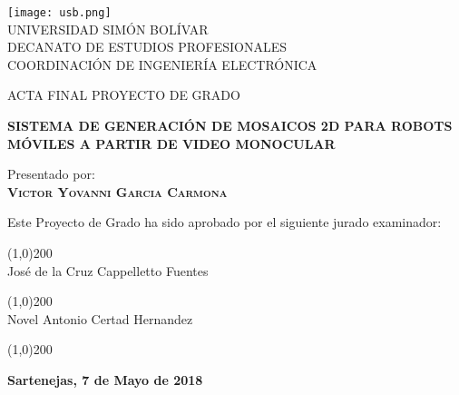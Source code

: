 \begin{titlepage}
\begin{center}

\texttt{[image: usb.png]} \\

\textsc {\large UNIVERSIDAD SIMÓN BOLÍVAR} \\
\textsc{DECANATO DE ESTUDIOS PROFESIONALES\\
COORDINACIÓN DE INGENIERÍA ELECTRÓNICA}

\bigskip
\bigskip
\bigskip
\bigskip

\textsc{ACTA FINAL PROYECTO DE GRADO}

\bigskip
\bigskip

\textsc{\bfseries SISTEMA DE GENERACIÓN DE MOSAICOS 2D PARA ROBOTS MÓVILES A PARTIR DE VIDEO MONOCULAR}

\bigskip
\bigskip
\bigskip

\begin{minipage}{\textwidth}
\centering
Presentado por: \\
\textsc{\bfseries Victor Yovanni Garcia Carmona} \\

\bigskip
\bigskip

Este Proyecto de Grado ha sido aprobado por el siguiente jurado examinador: \\

\bigskip
\bigskip

\line(1,0){200} \\
José de la Cruz Cappelletto Fuentes\\

\bigskip
\bigskip

\line(1,0){200} \\
Novel Antonio Certad Hernandez\\


\bigskip
\bigskip

\line(1,0){200} \\

\bigskip
\bigskip

\end{minipage}

\bigskip
\bigskip
\vfill

{\large \bfseries Sartenejas, 7 de Mayo de 2018}

\end{center}
\end{titlepage}
